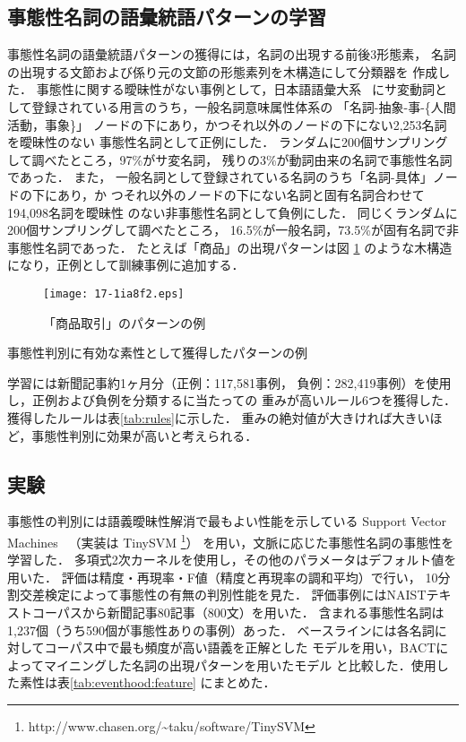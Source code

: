 \documentclass[japanese]{jnlp_1.4}
\begin{document}
\subsection{事態性名詞の語彙統語パターンの学習}

事態性名詞の語彙統語パターンの獲得には，名詞の出現する前後3形態素，
名詞の出現する文節および係り元の文節の形態素列を木構造にして分類器を
作成した．
事態性に関する曖昧性がない事例として，日本語語彙大系~\cite{ikehara:1997}
にサ変動詞として登録されている用言のうち，一般名詞意味属性体系の
「名詞-抽象-事-\{人間活動，事象\}」
ノードの下にあり，かつそれ以外のノードの下にない2,253名詞を曖昧性のない
事態性名詞として正例にした．
ランダムに200個サンプリングして調べたところ，97\%がサ変名詞，
残りの3\%が動詞由来の名詞で事態性名詞であった．
また，
一般名詞として登録されている名詞のうち「名詞-具体」ノードの下にあり，か
つそれ以外のノードの下にない名詞と固有名詞合わせて194,098名詞を曖昧性
のない非事態性名詞として負例にした．
同じくランダムに200個サンプリングして調べたところ，
16.5\%が一般名詞，73.5\%が固有名詞で非事態性名詞であった．
たとえば「商品」の出現パターンは図 \ref{fig:pattern}
のような木構造になり，正例として訓練事例に追加する．


\begin{figure}[b]
\begin{center}
\texttt{[image: 17-1ia8f2.eps]}
\end{center}
  \caption{「商品取引」のパターンの例}
  \label{fig:pattern}
\end{figure}
\begin{table}[b]
  \caption{事態性判別に有効な素性として獲得したパターンの例}
  \label{tab:rules}

\end{table}

学習には新聞記事約1ヶ月分\cite{mainichi:2002}（正例：117,581事例，
負例：282,419事例）を使用し，正例および負例を分類するに当たっての
重みが高いルール6つを獲得した．獲得したルールは表\ref{tab:rules}に示した．
重みの絶対値が大きければ大きいほど，事態性判別に効果が高いと考えられる．


\subsection{実験}
\label{subsec:eventhood}

事態性の判別には語義曖昧性解消で最もよい性能を示している
Support Vector Machines~\cite{vapnik:1998}
（実装は TinySVM \footnote{http://www.chasen.org/\~{}taku/software/TinySVM}）
を用い，文脈に応じた事態性名詞の事態性を学習した．
多項式2次カーネルを使用し，その他のパラメータはデフォルト値を用いた．
評価は精度・再現率・F値（精度と再現率の調和平均）で行い，
10分割交差検定によって事態性の有無の判別性能を見た．
評価事例にはNAISTテキストコーパスから新聞記事80記事（800文）を用いた．
含まれる事態性名詞は1,237個（うち590個が事態性ありの事例）あった．
ベースラインには各名詞に対してコーパス中で最も頻度が高い語義を正解とした
モデルを用い，BACTによってマイニングした名詞の出現パターンを用いたモデル
と比較した．使用した素性は表\ref{tab:eventhood:feature} にまとめた．
\end{document}
